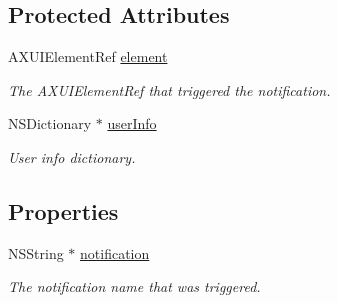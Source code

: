 \subsection*{Protected Attributes}
\begin{DoxyCompactItemize}
\item 
\hypertarget{interface_g_d_accessibility_notification_a8b20d367e858a860e134618752493f0c}{
AXUIElementRef \hyperlink{interface_g_d_accessibility_notification_a8b20d367e858a860e134618752493f0c}{element}}
\label{interface_g_d_accessibility_notification_a8b20d367e858a860e134618752493f0c}

\begin{DoxyCompactList}\small\item\em The AXUIElementRef that triggered the notification. \item\end{DoxyCompactList}\item 
\hypertarget{interface_g_d_accessibility_notification_a0fd79497e2441128299e3f1f98324451}{
NSDictionary $\ast$ \hyperlink{interface_g_d_accessibility_notification_a0fd79497e2441128299e3f1f98324451}{userInfo}}
\label{interface_g_d_accessibility_notification_a0fd79497e2441128299e3f1f98324451}

\begin{DoxyCompactList}\small\item\em User info dictionary. \item\end{DoxyCompactList}\end{DoxyCompactItemize}
\subsection*{Properties}
\begin{DoxyCompactItemize}
\item 
\hypertarget{interface_g_d_accessibility_notification_a3a35ac62a068bf9ea55170e1abc55bc9}{
NSString $\ast$ \hyperlink{interface_g_d_accessibility_notification_a3a35ac62a068bf9ea55170e1abc55bc9}{notification}}
\label{interface_g_d_accessibility_notification_a3a35ac62a068bf9ea55170e1abc55bc9}

\begin{DoxyCompactList}\small\item\em The notification name that was triggered. \item\end{DoxyCompactList}\end{DoxyCompactItemize}


